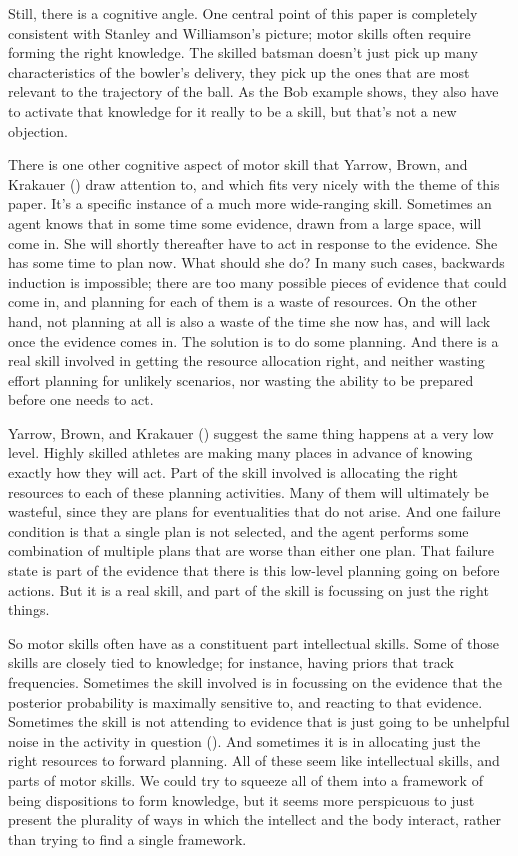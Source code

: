 \documentclass[
  11pt,
  letterpaper,
  DIV=11,
  numbers=noendperiod,
  oneside]{scrartcl}
\begin{document}
Still, there is a cognitive angle. One central point of this paper is
completely consistent with Stanley and Williamson's picture; motor
skills often require forming the right knowledge. The skilled batsman
doesn't just pick up many characteristics of the bowler's delivery, they
pick up the ones that are most relevant to the trajectory of the ball.
As the Bob example shows, they also have to activate that knowledge for
it really to be a skill, but that's not a new objection.

There is one other cognitive aspect of motor skill that Yarrow, Brown,
and Krakauer () draw attention to, and
which fits very nicely with the theme of this paper. It's a specific
instance of a much more wide-ranging skill. Sometimes an agent knows
that in some time some evidence, drawn from a large space, will come in.
She will shortly thereafter have to act in response to the evidence. She
has some time to plan now. What should she do? In many such cases,
backwards induction is impossible; there are too many possible pieces of
evidence that could come in, and planning for each of them is a waste of
resources. On the other hand, not planning at all is also a waste of the
time she now has, and will lack once the evidence comes in. The solution
is to do some planning. And there is a real skill involved in getting
the resource allocation right, and neither wasting effort planning for
unlikely scenarios, nor wasting the ability to be prepared before one
needs to act.

Yarrow, Brown, and Krakauer ()
suggest the same thing happens at a very low level. Highly skilled
athletes are making many places in advance of knowing exactly how they
will act. Part of the skill involved is allocating the right resources
to each of these planning activities. Many of them will ultimately be
wasteful, since they are plans for eventualities that do not arise. And
one failure condition is that a single plan is not selected, and the
agent performs some combination of multiple plans that are worse than
either one plan. That failure state is part of the evidence that there
is this low-level planning going on before actions. But it is a real
skill, and part of the skill is focussing on just the right things.

So motor skills often have as a constituent part intellectual skills.
Some of those skills are closely tied to knowledge; for instance, having
priors that track frequencies. Sometimes the skill involved is in
focussing on the evidence that the posterior probability is maximally
sensitive to, and reacting to that evidence. Sometimes the skill is not
attending to evidence that is just going to be unhelpful noise in the
activity in question (). And sometimes it is in allocating just the right
resources to forward planning. All of these seem like intellectual
skills, and parts of motor skills. We could try to squeeze all of them
into a framework of being dispositions to form knowledge, but it seems
more perspicuous to just present the plurality of ways in which the
intellect and the body interact, rather than trying to find a single
framework.
\end{document}
